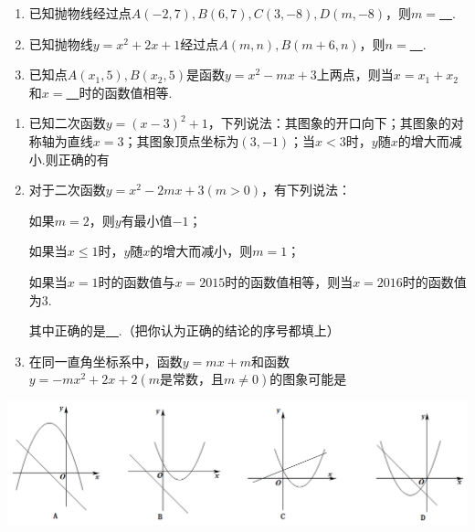 \documentclass[10pt]{ctexart}
\begin{document}
\begin{jply}{}{}
   \begin{enumerate}[(1)]
   \item 已知抛物线经过点$A(-2,7),B(6,7),C(3,-8),D(m,-8)$，则$m=$\underline{~\hspace{1cm}~}.
   \item 已知抛物线$y=x^2+2x+1$经过点$A(m,n),B(m+6,n)$，则$n=$\underline{~\hspace{1cm}~}.
   \item 已知点$A(x_1,5),B(x_2,5)$是函数$y=x^2-mx+3$上两点，则当$x=x_1+x_2$和$x=$\underline{~\hspace{1cm}~}时的函数值相等.
   \end{enumerate}
\end{jply}
\begin{jply}{}{}
   \begin{enumerate}[(1)]
   \item 已知二次函数$y=(x-3)^2+1$，下列说法：其图象的开口向下；其图象的对称轴为直线$x=3$；其图象顶点坐标为$(3,-1)$；当$x<3$时，$y$随$x$的增大而减小.则正确的有
   
   
   \item 对于二次函数$y=x^2-2mx+3(m>0)$，有下列说法：
   
   如果$m=2$，则$y$有最小值$-1$；
   
   如果当$x\leqslant 1$时，$y$随$x$的增大而减小，则$m=1$；
   
   如果当$x=1$时的函数值与$x=2015$时的函数值相等，则当$x=2016$时的函数值为$3$.
   
   其中正确的是\underline{~\hspace{1cm}~}.（把你认为正确的结论的序号都填上）
   \item 在同一直角坐标系中，函数$y=mx+m$和函数$y=-mx^2+2x+2(m\text{是常数，且}m\neq 0)$的图象可能是
   \end{enumerate}
\end{jply}

\includegraphics[scale=0.6]{figure/g-3.PNG} 
\end{document}
